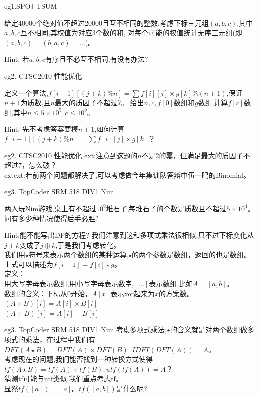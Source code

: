 \documentclass[allowframebreaks,10pt]{beamer}
\begin{document}
\begin{frame}{eg1.SPOJ TSUM}
\begin{example}
给定40000个绝对值不超过20000且互不相同的整数,考虑下标三元组$(a,b,c)$,其中$a,b,c$互不相同,其权值为对应3个数的和,
	对每个可能的权值统计无序三元组(即$(a,b,c)=(b,a,c)=\ldots$)。
\end{example}
Hint: 若$a,b,c$有序且不必互不相同,有没有办法?
\end{frame}

\begin{frame}{eg2. CTSC2010 性能优化}
\begin{example}
定义一个算法,$f[i+1][(j+k)\%n]=\sum f[i][j] \times g[k] \% (n+1)$,保证$n+1$为质数,且$n$最大的质因子不超过7。
给出$n,c,f[0]$数组和$g$数组,计算$f[c]$数组,其中$n \le 5 \times 10^5, c \le 10^9$。
\end{example}
Hint: 先不考虑答案要模$n+1$,如何计算$f[i+1][(j+k)\%n]=\sum f[i][j] \times g[k]$？
\end{frame}

\begin{frame}{eg2. CTSC2010 性能优化}
ext:注意到这题的$n$不是2的幂，但满足最大的质因子不超过7，怎么破？ \\
\pause
extext:若前两个问题都解决了,可以考虑做今年集训队答辩中伍一鸣的Binomial。
\end{frame}


\begin{frame}{eg3. TopCoder SRM 518 DIV1 Nim}
\begin{example}
两人玩Nim游戏,桌上有不超过$10^9$堆石子,每堆石子的个数是质数且不超过$5 \times 10^4$。问有多少种情况使得后手必胜?
\end{example}
\pause
Hint:能不能写出DP的方程? \newline
\pause
我们注意到这和多项式乘法很相似,只不过下标变化从$j+k$变成了$j\oplus k$,于是我们考虑转化。 \\
\pause
我们用$\star$符号来表示两个数组的某种运算,$\star$的两个参数是数组，返回的也是数组。上式可以描述为$f[i+1]=f[i]\star g$。\\
定义：\\
用大写字母表示数组,用小写字母表示数字,$[\ldots]$表示数组,比如$A=[a,b]$。\\
数组的含义：下标从0开始，$A[x]$表示xor起来为$x$的方案数。\\
$(A\times B)[i]=A[i]\times B[i]$ \\
$(A+B)[i]=A[i]+B[i]$ \\
\end{frame}
\begin{frame}{eg3. TopCoder SRM 518 DIV1 Nim}
考虑多项式乘法,$\star$的含义就是对两个数组做多项式的乘法，在过程中我们有 \\
$DFT(A \star B)=DFT(A)\times DFT(B)$,
$IDFT(DFT(A))=A$。\\
\pause
考虑现在的问题,我们能否找到一种转换方式使得$tf(A\star B)=tf(A) \times tf(B), utf(tf(A))=A$？\\
猜测tf可能与utf类似,我们重点考虑tf。\\
\pause
显然$tf([a])=[a]$。$tf([a,b])$是什么呢?\\
\end{frame}
\end{document}
